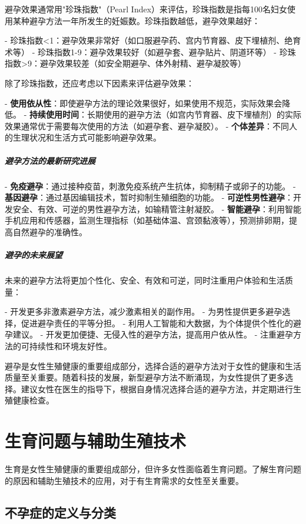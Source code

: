 \begin{enumerate}
避孕效果通常用"珍珠指数"（Pearl Index）来评估，珍珠指数是指每100名妇女使用某种避孕方法一年所发生的妊娠数。珍珠指数越低，避孕效果越好：

- 珍珠指数<1：避孕效果非常好（如口服避孕药、宫内节育器、皮下埋植剂、绝育术等）
- 珍珠指数1-9：避孕效果较好（如避孕套、避孕贴片、阴道环等）
- 珍珠指数>9：避孕效果较差（如安全期避孕、体外射精、避孕凝胶等）

除了珍珠指数，还应考虑以下因素来评估避孕效果：

- \textbf{使用依从性}：即使避孕方法的理论效果很好，如果使用不规范，实际效果会降低。
- \textbf{持续使用时间}：长期使用的避孕方法（如宫内节育器、皮下埋植剂）的实际效果通常优于需要每次使用的方法（如避孕套、避孕凝胶）。
- \textbf{个体差异}：不同人的生理状况和生活方式可能影响避孕效果。

\subparagraph{避孕方法的最新研究进展}

- \textbf{免疫避孕}：通过接种疫苗，刺激免疫系统产生抗体，抑制精子或卵子的功能。
- \textbf{基因避孕}：通过基因编辑技术，暂时抑制生殖细胞的功能。
- \textbf{可逆性男性避孕}：开发安全、有效、可逆的男性避孕方法，如输精管注射凝胶。
- \textbf{智能避孕}：利用智能手机应用和传感器，监测生理指标（如基础体温、宫颈黏液等），预测排卵期，提高自然避孕的准确性。

\subparagraph{避孕的未来展望}

未来的避孕方法将更加个性化、安全、有效和可逆，同时注重用户体验和生活质量：

- 开发更多非激素避孕方法，减少激素相关的副作用。
- 为男性提供更多避孕选择，促进避孕责任的平等分担。
- 利用人工智能和大数据，为个体提供个性化的避孕建议。
- 开发更加便捷、无侵入性的避孕方法，提高用户依从性。
- 注重避孕方法的可持续性和环境友好性。

避孕是女性生殖健康的重要组成部分，选择合适的避孕方法对于女性的健康和生活质量至关重要。随着科技的发展，新型避孕方法不断涌现，为女性提供了更多选择。建议女性在医生的指导下，根据自身情况选择合适的避孕方法，并定期进行生殖健康检查。

\section{生育问题与辅助生殖技术}

生育是女性生殖健康的重要组成部分，但许多女性面临着生育问题。了解生育问题的原因和辅助生殖技术的应用，对于有生育需求的女性至关重要。

\subsection{不孕症的定义与分类}


\end{enumerate}
